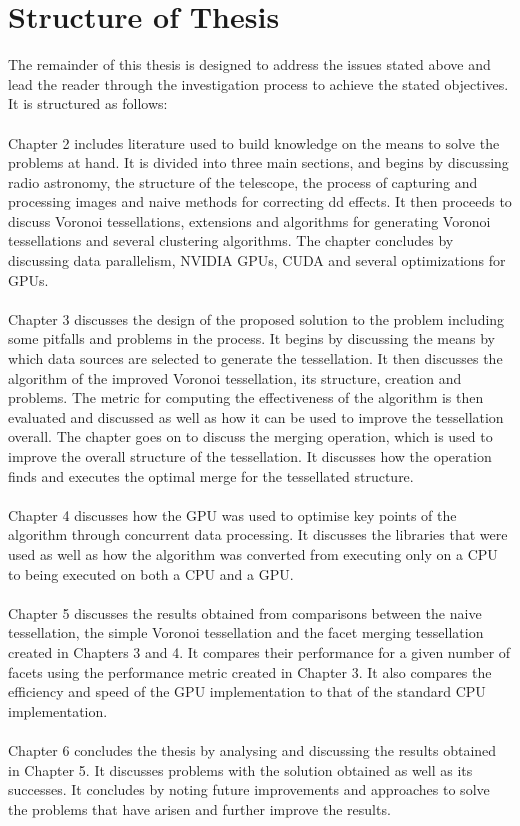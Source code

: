 \section{Structure of Thesis}
The remainder of this thesis is designed to address the issues stated above and lead the reader through the investigation process to achieve the stated objectives. It is structured as follows:
\\
\\
Chapter 2 includes literature used to build knowledge on the means to solve the problems at hand. It is divided into three main sections, and begins by discussing radio astronomy, the structure of the telescope, the process of capturing and processing images and naive methods for correcting \gls{dd} effects. It then proceeds to discuss Voronoi tessellations, extensions and algorithms for generating Voronoi tessellations and several clustering algorithms. The chapter concludes by discussing data parallelism, NVIDIA GPUs, CUDA and several optimizations for GPUs.
\\
\\
Chapter 3 discusses the design of the proposed solution to the problem including some pitfalls and problems in the process. It begins by discussing the means by which data sources are selected to generate the tessellation. It then discusses the algorithm of the improved Voronoi tessellation, its structure, creation and problems. The metric for computing the effectiveness of the algorithm is then evaluated and discussed as well as how it can be used to improve the tessellation overall. The chapter goes on to discuss the merging operation, which is used to improve the overall structure of the tessellation. It discusses how the operation finds and executes the optimal merge for the tessellated structure.
\\
\\
Chapter 4 discusses how the GPU was used to optimise key points of the algorithm through concurrent data processing. It discusses the libraries that were used as well as how the algorithm was converted from executing only on a CPU to being executed on both a CPU and a GPU.
\\
\\
Chapter 5 discusses the results obtained from comparisons between the naive tessellation, the simple Voronoi tessellation and the facet merging tessellation created in Chapters 3 and 4. It compares their performance for a given number of facets using the performance metric created in Chapter 3. It also compares the efficiency and speed of the GPU implementation to that of the standard CPU implementation.
\\
\\
Chapter 6 concludes the thesis by analysing and discussing the results obtained in Chapter 5. It discusses problems with the solution obtained as well as its successes. It concludes by noting future improvements and approaches to solve the problems that have arisen and further improve the results.
